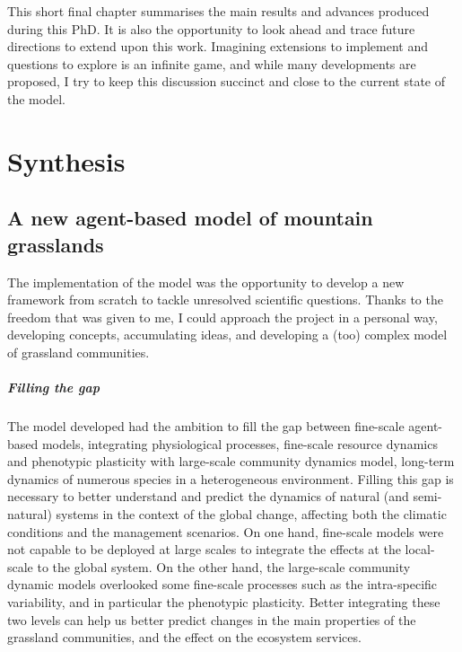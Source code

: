 
\begin{fullwidth}
This short final chapter summarises the main results and advances produced during this PhD. It is also the opportunity to look ahead and trace future directions to extend upon this work. Imagining extensions to implement and questions to explore is an infinite game, and while many developments are proposed, I try to keep this discussion succinct and close to the current state of the model.
\end{fullwidth}

\chapter{Synthesis}
%
%
%
\section{A new agent-based model of mountain grasslands}

The implementation of the model \model was the opportunity to develop a new framework from scratch to tackle unresolved scientific questions. Thanks to the freedom that was given to me, I could approach the project in a personal way, developing concepts, accumulating ideas, and developing a (too) complex model of grassland communities.

\paragraph{Filling the gap}

The model developed had the ambition to fill the gap between fine-scale agent-based models, integrating physiological processes, fine-scale resource dynamics and phenotypic plasticity with large-scale community dynamics model, long-term dynamics of numerous species in a heterogeneous environment. Filling this gap is necessary to better understand and predict the dynamics of natural (and semi-natural) systems in the context of the global change, affecting both the climatic conditions and the management scenarios. On one hand, fine-scale models were not capable to be deployed at large scales to integrate the effects at the local-scale to the global system. On the other hand, the large-scale community dynamic models overlooked some fine-scale processes such as the intra-specific variability, and in particular the phenotypic plasticity. Better integrating these two levels can help us better predict changes in the main properties of the grassland communities, and the effect on the ecosystem services.

